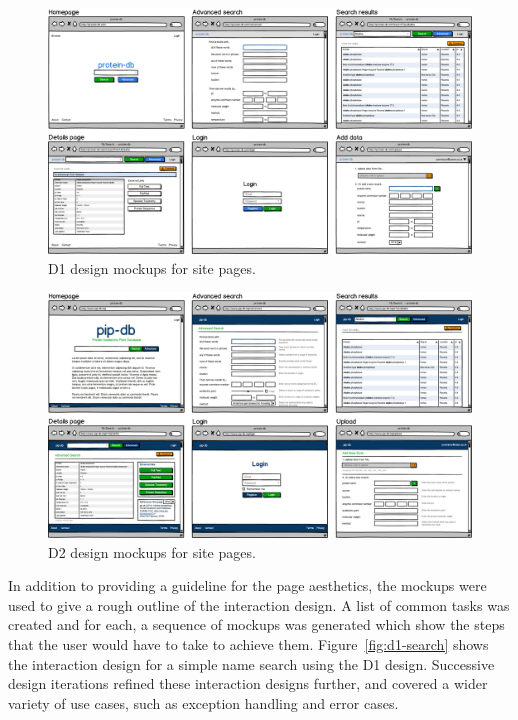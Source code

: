 \begin{figure}[H]
\centering
    \includegraphics[width=\textwidth]{assets/d1-mockups}
\caption[D1 design mockups for site pages]
        {D1 design mockups for site pages.}
\label{fig:d1-mockups}
\end{figure}


\begin{figure}[H]
\centering
    \includegraphics[width=\textwidth]{assets/d2-mockups}
\caption[D2 design mockups for site pages]
        {D2 design mockups for site pages.}
\label{fig:d2-mockups}
\end{figure}

\newpage
In addition to providing a guideline for the page aesthetics, the
mockups were used to give a rough outline of the interaction design. A
list of common tasks was created and for each, a sequence of mockups
was generated which show the steps that the user would have to take to
achieve them. Figure~\ref{fig:d1-search} shows the interaction design
for a simple name search using the D1 design. Successive design
iterations refined these interaction designs further, and covered a
wider variety of use cases, such as exception handling and error
cases.


